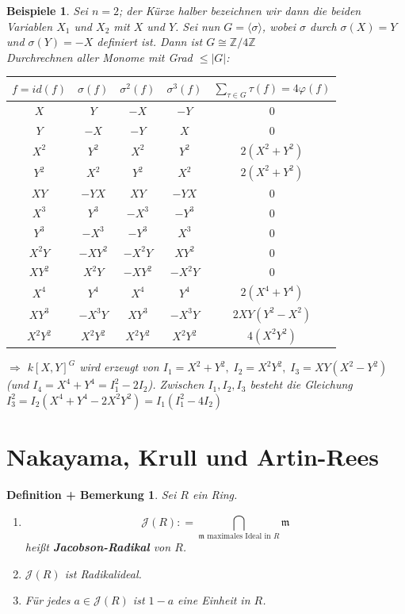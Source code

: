 \documentclass[a4paper,12pt]{scrbook}
\theoremstyle{break}
\newtheorem{DefBem}[Def]{Definition + Bemerkung}
\theoremstyle{nonumberbreak}
\newtheorem{nnBsp}{Beispiele}
\theoremstyle{nonumberplain}
\newcommand{\emp}[1]{\textbf{\emph{#1}}}
\newcommand{\defeqr}[0]{\mathrel{\mathop:}=}
\begin{document}
\begin{nnBsp}
Sei $n=2$; der Kürze halber bezeichnen wir dann die beiden Variablen $X_1$ und $X_2$
mit $X$ und $Y$.
Sei nun $G=\langle \sigma \rangle$, wobei $\sigma$ durch $\sigma(X) = Y$ und
 $\sigma(Y) = -X$ definiert ist. Dann ist $ G \cong \mathbb{Z}/4\mathbb{Z}$\\
Durchrechnen aller Monome mit Grad $\leq |G|$:

{\footnotesize
\begin{tabular}{|cccc|c|}
  \hline
  $f = id(f)$ & $\sigma(f)$ & $\sigma^2(f)$ & $\sigma^3(f)$ & $\sum_{\tau \in G} \tau(f) = 4 \varphi(f)$ \\
  \hline
  $X$ & $Y$ & $-X$ & $-Y$ & $0$ \\
  $Y$ & $-X$ & $-Y$ & $X$ & $0$ \\
  $X^2$ & $Y^2$ & $X^2$ & $Y^2$ & $2(X^2+Y^2)$ \\
  $Y^2$ & $X^2$ & $Y^2$ & $X^2$ & $2(X^2+Y^2)$ \\
  $XY$ & $-YX$ & $XY$ & $-YX$ & $0$ \\
  $X^3$ & $Y^3$ & $-X^3$ & $-Y^3$ & $0$ \\
  $Y^3$ & $-X^3$ & $-Y^3$ & $X^3$ & $0$ \\
  $X^2Y$ & $-XY^2$ & $-X^2Y$ & $X Y^2$ & $0$ \\
  $X Y^2$ & $X^2Y$ & $-XY^2$ & $-X^2Y$ & $0$ \\
  $X^4$ & $Y^4$ & $X^4$ & $Y^4$ & $2(X^4+Y^4)$ \\
  $XY^3$ & $-X^3Y$ & $XY^3$ & $-X^3Y$ & $2XY(Y^2-X^2)$ \\
  $X^2Y^2$ & $X^2Y^2$ & $X^2Y^2$ & $X^2Y^2$ & $4(X^2Y^2)$ \\
  \hline
\end{tabular}}

$\Rightarrow$ $k[X,Y]^G$ wird erzeugt von $I_1 = X^2+Y^2, \; I_2 = X^2Y^2, \; I_3 = XY(X^2-Y^2)$ (und $I_4 = X^4 + Y^4 = I_1^2-2I_2$). Zwischen $I_1,I_2,I_3$ besteht die Gleichung $I_3^2 = I_2(X^4+Y^4-2X^2Y^2)=I_1(I_1^2-4I_2)$
\end{nnBsp}
\section{Nakayama, Krull und Artin-Rees}

\begin{DefBem}

Sei $R$ ein Ring.
\begin{enumerate}
\item $$\mathcal{J}(R) \defeqr \bigcap_{\mathfrak{m}\text{ maximales Ideal in }R}\mathfrak{m}$$ heißt \emp{Jacobson-Radikal} von $R$.
\item $\mathcal{J}(R)$ ist Radikalideal.
\item \label{2.20c} Für jedes $a \in \mathcal{J}(R)$ ist $1-a$ eine Einheit in $R$.
\end{enumerate}

\end{DefBem}
\end{document}
